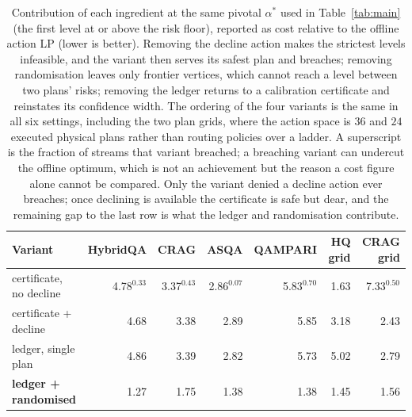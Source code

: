 \begin{table}[t]
\centering
\caption{Contribution of each ingredient at the same pivotal $\alpha^{*}$ used in Table~\ref{tab:main} (the first level at or above the risk floor), reported as cost relative to the offline action LP (lower is better). Removing the decline action makes the strictest levels infeasible, and the variant then serves its safest plan and breaches; removing randomisation leaves only frontier vertices, which cannot reach a level between two plans' risks; removing the ledger returns to a calibration certificate and reinstates its confidence width. The ordering of the four variants is the same in all six settings, including the two plan grids, where the action space is $36$ and $24$ executed physical plans rather than routing policies over a ladder. A superscript is the fraction of streams that variant breached; a breaching variant can undercut the offline optimum, which is not an achievement but the reason a cost figure alone cannot be compared. Only the variant denied a decline action ever breaches; once declining is available the certificate is safe but dear, and the remaining gap to the last row is what the ledger and randomisation contribute.}
\label{tab:ablation}
\footnotesize
\setlength{\tabcolsep}{4pt}
\begin{tabular}{lrrrrrr}
\toprule
Variant & HybridQA & CRAG & ASQA & QAMPARI & HQ grid & CRAG grid \\
\midrule
certificate, no decline & 4.78$^{0.33}$ & 3.37$^{0.43}$ & 2.86$^{0.07}$ & 5.83$^{0.70}$ & 1.63 & 7.33$^{0.50}$ \\
certificate + decline & 4.68 & 3.38 & 2.89 & 5.85 & 3.18 & 2.43 \\
ledger, single plan & 4.86 & 3.39 & 2.82 & 5.73 & 5.02 & 2.79 \\
\textbf{ledger + randomised} & 1.27 & 1.75 & 1.38 & 1.38 & 1.45 & 1.56 \\
\bottomrule
\end{tabular}
\end{table}
